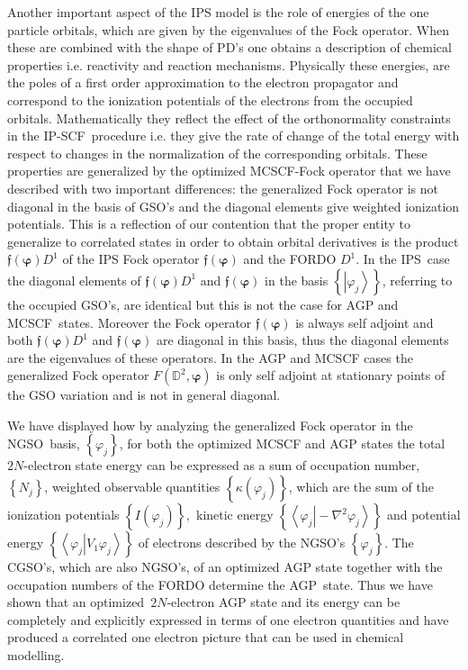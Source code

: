 \documentclass[titlepage]{article}%
\begin{document}
Another important aspect of the IPS model is the role of energies of the one
particle orbitals, which are given by the eigenvalues of the Fock operator.
When these are combined with the shape of PD's one obtains a description of
chemical properties i.e. reactivity and reaction mechanisms. Physically these
energies, are the poles of a first order approximation to the electron
propagator and correspond to the ionization potentials of the electrons from
the occupied orbitals. Mathematically they reflect the effect of the
orthonormality constraints in the IP-SCF\ procedure i.e. they give the rate of
change of the total energy with respect to changes in the normalization of the
corresponding orbitals. These properties are generalized by the optimized
MCSCF-Fock operator that we have described with two important differences: the
generalized Fock operator is not diagonal in the basis of GSO's and the
diagonal elements give weighted ionization potentials. This is a reflection of
our contention that the proper entity to generalize to correlated states in
order to obtain orbital derivatives is the product $\mathfrak{f}\left(
\bm{\varphi}\right)  D^{1}$ of the IPS Fock operator $\mathfrak{f}\left(
\bm{\varphi}\right)  $ and the FORDO $D^{1}$. In the IPS\ case the diagonal
elements of $\mathfrak{f}\left(  \bm{\varphi}\right)  D^{1}$ and
$\mathfrak{f}\left(  \bm{\varphi}\right)  $ in the basis $\left\{  \left\vert
\varphi_{j}\right\rangle \right\}  $, referring to the occupied GSO's, are
identical but this is not the case for AGP and MCSCF\ states. Moreover the
Fock operator $\mathfrak{f}\left(  \bm{\varphi}\right)  $ is always self
adjoint and both $\mathfrak{f}\left(  \bm{\varphi}\right)  D^{1}$ and
$\mathfrak{f}\left(  \bm{\varphi}\right)  $ are diagonal in this basis, thus
the diagonal elements are the eigenvalues of these operators. In the AGP and
MCSCF cases the generalized Fock operator $F\left(  \mathbb{D}^{2}%
,\bm{\varphi}\right)  $ is only self adjoint at stationary points of the GSO
variation and is not in general diagonal.

We have displayed how by analyzing the generalized Fock operator in the
NGSO\ basis, $\left\{  \varphi_{j}\right\}  $, for both the optimized MCSCF
and AGP states the total $2N$-electron state energy can be expressed as a sum
of occupation number, $\left\{  N_{j}\right\}  $, weighted observable
quantities $\left\{  \kappa\left(  \varphi_{j}\right)  \right\}  $, which are
the sum of the ionization potentials $\left\{  I\left(  \varphi_{j}\right)
\right\}  ,$ kinetic energy $\left\{  \left\langle \left.  \varphi
_{j}\right\vert -\nabla^{2}\varphi_{j}\right\rangle \right\}  $ and potential
energy $\left\{  \left\langle \left.  \varphi_{j}\right\vert V_{1}\varphi
_{j}\right\rangle \right\}  $ of electrons described by the NGSO's $\left\{
\varphi_{j}\right\}  $. The CGSO's, which are also NGSO's, of an optimized AGP
state together with the occupation numbers of the FORDO determine the
AGP\ state. Thus we have shown that an optimized~$2N$-electron AGP state and
its energy can be completely and explicitly expressed in terms of one electron
quantities and have produced a correlated one electron picture that can be
used in chemical modelling.
\end{document}
